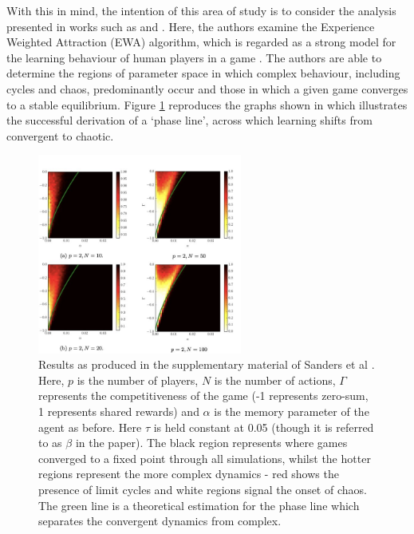 \documentclass[.../main.tex]{subfiles}
\begin{document}
	With this in mind, the intention of this area of study is to consider the analysis presented in
	works such as \cite{Sanders2018} and \cite{Galla2011}. Here, the authors examine the
	Experience Weighted Attraction (EWA) algorithm, which is regarded as a strong model for the
	learning behaviour of human players in a game \cite{Camerer2009}. The authors are able to
	determine the regions of parameter space in which complex behaviour,
	including cycles and chaos, predominantly occur and those in which a given game converges to a
	stable equilibrium. Figure \ref{fig::GallaPredictions} reproduces the graphs shown in \cite{Sanders2018} which
	illustrates the successful derivation of a `phase line', across which learning shifts from
	convergent to chaotic.

    \begin{figure}[h]
    	\centering
    	\includegraphics[width=0.6\textwidth]{Figures/GallaPredictions}
    	\caption{ \label{fig::GallaPredictions} Results as produced in the supplementary material
    	of Sanders et al \cite{Sanders2018}. Here, $p$ is the number of players, $N$ is the number
    	of actions, $\Gamma$ represents the competitiveness of the game (-1 represents zero-sum, 1
    	represents shared rewards) and $\alpha$ is the memory parameter of the agent as before.
    	Here $\tau$ is held constant at 0.05 (though it is referred to as $\beta$ in the paper).
    	The black region represents where games converged to a fixed point through all simulations,
    	whilst the hotter regions represent the more complex dynamics - red shows the presence of
    	limit cycles and white regions signal the onset of chaos. The green line is a theoretical
    	estimation for the phase line which separates the convergent dynamics from complex.}
    \end{figure}
\end{document}
